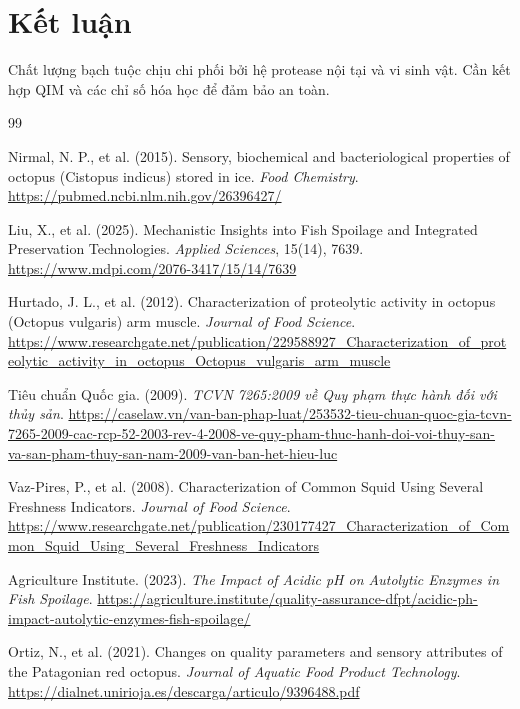 \documentclass[12pt,a4paper]{report}
\begin{document}
\section{Kết luận}

Chất lượng bạch tuộc chịu chi phối bởi hệ protease nội tại và vi sinh vật. Cần kết hợp QIM và các chỉ số hóa học để đảm bảo an toàn.

\newpage
\renewcommand{\bibname}{Tài liệu tham khảo Chương 2}
\begin{thebibliography}{99}

 Nirmal, N. P., et al. (2015). Sensory, biochemical and bacteriological properties of octopus (Cistopus indicus) stored in ice. \textit{Food Chemistry}. \url{https://pubmed.ncbi.nlm.nih.gov/26396427/}

 Liu, X., et al. (2025). Mechanistic Insights into Fish Spoilage and Integrated Preservation Technologies. \textit{Applied Sciences}, 15(14), 7639. \url{https://www.mdpi.com/2076-3417/15/14/7639}

 Hurtado, J. L., et al. (2012). Characterization of proteolytic activity in octopus (Octopus vulgaris) arm muscle. \textit{Journal of Food Science}. \url{https://www.researchgate.net/publication/229588927_Characterization_of_proteolytic_activity_in_octopus_Octopus_vulgaris_arm_muscle}

 Tiêu chuẩn Quốc gia. (2009). \textit{TCVN 7265:2009 về Quy phạm thực hành đối với thủy sản}. \url{https://caselaw.vn/van-ban-phap-luat/253532-tieu-chuan-quoc-gia-tcvn-7265-2009-cac-rcp-52-2003-rev-4-2008-ve-quy-pham-thuc-hanh-doi-voi-thuy-san-va-san-pham-thuy-san-nam-2009-van-ban-het-hieu-luc}

 Vaz-Pires, P., et al. (2008). Characterization of Common Squid Using Several Freshness Indicators. \textit{Journal of Food Science}. \url{https://www.researchgate.net/publication/230177427_Characterization_of_Common_Squid_Using_Several_Freshness_Indicators}

 Agriculture Institute. (2023). \textit{The Impact of Acidic pH on Autolytic Enzymes in Fish Spoilage}. \url{https://agriculture.institute/quality-assurance-dfpt/acidic-ph-impact-autolytic-enzymes-fish-spoilage/}

 Ortiz, N., et al. (2021). Changes on quality parameters and sensory attributes of the Patagonian red octopus. \textit{Journal of Aquatic Food Product Technology}. \url{https://dialnet.unirioja.es/descarga/articulo/9396488.pdf}


\end{thebibliography}
\end{document}
